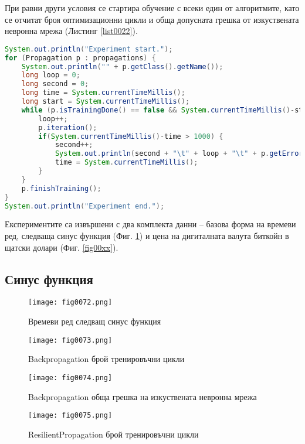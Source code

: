 При равни други условия се стартира обучение с всеки един от алгоритмите, като се отчитат броя оптимизационни цикли и обща допусната грешка от изкуствената невронна мрежа (Листинг \ref{list0022}).

\begin{lstlisting}[caption=Експериментална проверка на точните числени методи, language=Java, basicstyle=\tiny, label=list0022]
System.out.println("Experiment start.");
for (Propagation p : propagations) {
    System.out.println("" + p.getClass().getName());
    long loop = 0;
    long second = 0;
    long time = System.currentTimeMillis();
    long start = System.currentTimeMillis();
    while (p.isTrainingDone() == false && System.currentTimeMillis()-start < 1*60*1000) {
        loop++;
        p.iteration();
        if(System.currentTimeMillis()-time > 1000) {
            second++;
            System.out.println(second + "\t" + loop + "\t" + p.getError());
            time = System.currentTimeMillis();
        }
    }
    p.finishTraining();
}
System.out.println("Experiment end.");
\end{lstlisting}

Експериментите са извършени с два комплекта данни – базова форма на времеви ред, следваща синус функция (Фиг. \ref{fig0072}) и цена на дигиталната валута биткойн в щатски долари (Фиг. \ref{fig00xx}). 

\subsection{Синус функция}

\begin{figure}[H]
  \centering
  \texttt{[image: fig0072.png]}
  \caption{Времеви ред следващ синус функция}
\label{fig0072}
\end{figure}

\begin{figure}[H]
  \centering
  \texttt{[image: fig0073.png]}
  \caption{Backpropagation брой тренировъчни цикли}
\label{fig0073}
\end{figure}

\begin{figure}[H]
  \centering
  \texttt{[image: fig0074.png]}
  \caption{Backpropagation обща грешка на изкуствената невронна мрежа}
\label{fig0074}
\end{figure}

\begin{figure}[H]
  \centering
  \texttt{[image: fig0075.png]}
  \caption{ResilientPropagation брой тренировъчни цикли}
\label{fig0075}
\end{figure}

